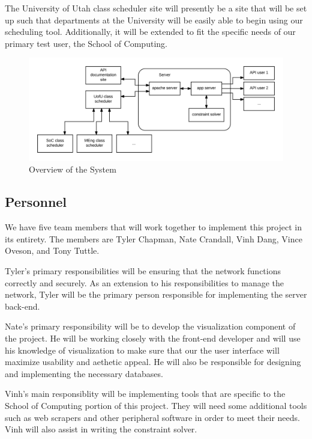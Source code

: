 \documentclass{extarticle}
\begin{document}
The University of Utah class scheduler site will presently be a site that will be set up such that departments at
the University will be easily able to begin using our scheduling tool.  Additionally, it will be extended to fit the
specific needs of our primary test user, the School of Computing.

\begin{figure}[!ht]
\centering
\includegraphics[width=1.0\textwidth]{img/general_sys_arch}
\caption{Overview of the System}
\label{fig:sys_arch}
\end{figure}

\subsection{Personnel}

We have five team members that will work together to implement this project in its entirety.  The members are
Tyler Chapman, Nate Crandall, Vinh Dang, Vince Oveson, and Tony Tuttle.

Tyler's primary responsibilities will be ensuring that the network functions correctly and securely.  As an
extension to his responsibilities to manage the network, Tyler will be the primary person responsible for
implementing the server back-end.

Nate's primary responsibility will be to develop the visualization component of the project.  He will be working
closely with the front-end developer and will use his knowledge of visualization to make sure that our the user
interface will maximize usability and aethetic appeal.  He will also be responsible for designing and implementing
the necessary databases.

Vinh's main responsiblity will be implementing tools that are specific to the School of Computing portion of this
project.  They will need some additional tools such as web scrapers and other peripheral software in order to meet
their needs.  Vinh will also assist in writing the constraint solver.
\end{document}
